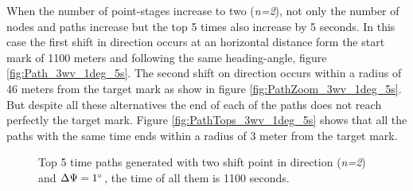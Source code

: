 When the number of point-stages increase to two (\textit{n=2}), not only the number of nodes and paths increase but the top 5 times also increase by 5 seconds. In this case the first shift in direction occurs at an horizontal distance form the start mark of 1100 meters and following the same heading-angle, figure \ref{fig:Path_3wv_1deg_5s}. The second shift on direction occurs within a radius of 46 meters from the target mark as show in figure \ref{fig:PathZoom_3wv_1deg_5s}. But despite all these alternatives the end of each of the paths does not reach perfectly the target mark. Figure \ref{fig:PathTops_3wv_1deg_5s} shows that all the paths with the same time ends within a radius of 3 meter from the target mark.  \par 

\begin{figure} [hbt!]
  \centering
  \hfill
  \hfill 
  \caption{Top 5 time paths generated with two shift point in direction (\textit{n=2}) and $\Delta \Psi =1\degree$, the time of all them is 1100 seconds.}
\label{fig:Paths_3wv_1deg_5s}
\end{figure}

